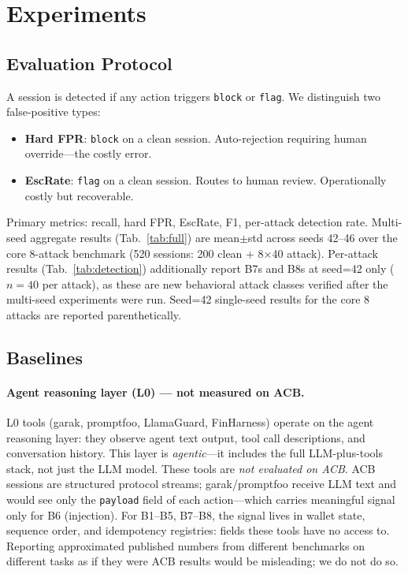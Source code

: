 \documentclass{article}
\begin{document}
\section{Experiments}
\label{sec:experiments}

\subsection{Evaluation Protocol}

A session is detected if any action triggers \texttt{block} or \texttt{flag}.
We distinguish two false-positive types:
\begin{itemize}
\item \textbf{Hard FPR}: \texttt{block} on a clean session. Auto-rejection
  requiring human override---the costly error.
\item \textbf{EscRate}: \texttt{flag} on a clean session. Routes to human
  review. Operationally costly but recoverable.
\end{itemize}

Primary metrics: recall, hard FPR, EscRate, F1, per-attack detection rate.
Multi-seed aggregate results (Tab.~\ref{tab:full}) are mean$\pm$std across seeds 42--46
over the core 8-attack benchmark (520 sessions: 200 clean + 8$\times$40 attack).
Per-attack results (Tab.~\ref{tab:detection}) additionally report B7s and B8s at
seed=42 only ($n{=}40$ per attack), as these are new behavioral attack classes verified
after the multi-seed experiments were run. Seed=42 single-seed results for the core
8 attacks are reported parenthetically.

\subsection{Baselines}

\paragraph{Agent reasoning layer (L0) --- not measured on ACB.}
L0 tools (garak, promptfoo, LlamaGuard, FinHarness) operate on the agent
reasoning layer: they observe agent text output, tool call descriptions,
and conversation history. This layer is \emph{agentic}---it includes the full
LLM-plus-tools stack, not just the LLM model. These tools are \emph{not
evaluated on ACB}. ACB sessions are structured protocol streams;
garak/promptfoo receive LLM text and would see only the \texttt{payload} field
of each action---which carries meaningful signal only for B6 (injection).
For B1--B5, B7--B8, the signal lives in wallet state, sequence order, and
idempotency registries: fields these tools have no access to. Reporting
approximated published numbers from different benchmarks on different tasks as
if they were ACB results would be misleading; we do not do so.
\end{document}
